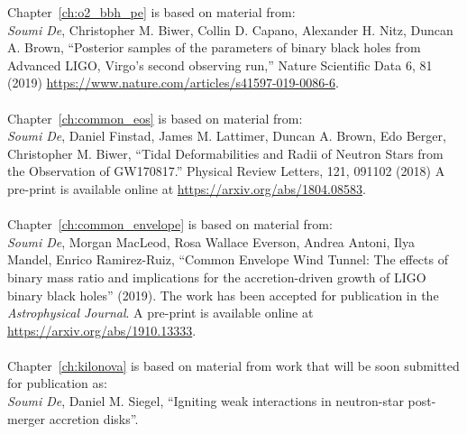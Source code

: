 \documentclass[12pt,notitlepage]{report}
\begin{document}
\havededicationtrue
\dedication{To Ma, Baba, \& Reshmi}
\haveminorfalse
{}
\copyrighttrue
\doctoratetrue
\figurespagetrue
\tablespagetrue
\electronicsubmittrue
\Acknowledgments{
}
\beforepreface
{}
Chapter~\ref{ch:o2_bbh_pe} is based on material from: \\
\textit{Soumi De}, Christopher M. Biwer, Collin D. Capano, Alexander H. Nitz, Duncan A. Brown, ``Posterior samples of the parameters of binary black holes from Advanced LIGO, Virgo's second observing run,'' Nature Scientific Data 6, 81 (2019) \url{https://www.nature.com/articles/s41597-019-0086-6}.
\\ \\
Chapter~\ref{ch:common_eos} is based on material from:  \\
\textit{Soumi De}, Daniel Finstad, James M. Lattimer, Duncan A. Brown, Edo Berger, Christopher M. Biwer, ``Tidal Deformabilities and Radii of Neutron Stars from the Observation of GW170817.'' Physical Review Letters, 121, 091102 (2018) A pre-print is available online at \url{https://arxiv.org/abs/1804.08583}.
\\ \\
Chapter~\ref{ch:common_envelope} is based on material from: \\
\textit{Soumi De}, Morgan MacLeod, Rosa Wallace Everson, Andrea Antoni, Ilya Mandel, Enrico Ramirez-Ruiz, ``Common Envelope Wind Tunnel: The effects of binary mass ratio and implications for the accretion-driven growth of LIGO binary black holes'' (2019). The work has been accepted for publication in the \textit{Astrophysical Journal}. A pre-print is available online at \url{https://arxiv.org/abs/1910.13333}.
\\ \\
Chapter~\ref{ch:kilonova} is based on material from work that will be soon submitted for publication as: \\
\textit{Soumi De}, Daniel M. Siegel, ``Igniting weak interactions in neutron-star post-merger accretion disks''.
\\
\afterpreface
{}
\label{ch:Introduction}

\label{ch:o2_bbh_pe}

\label{ch:common_eos}

\end{document}
